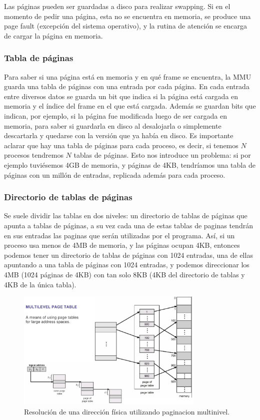 \documentclass{article}
\begin{document}
Las páginas pueden ser guardadas a disco para realizar swapping. Si en el momento de pedir una p\'agina, esta no se encuentra en memoria, se produce una page fault (excepci\'on del sistema operativo), y la rutina de atenci\'on se encarga de cargar la p\'agina en memoria. 

\subsubsection{Tabla de páginas}
Para saber si una p\'agina est\'a en memoria y en qu\'e frame se encuentra, la MMU guarda una tabla de p\'aginas con una entrada por cada p\'agina. En cada entrada entre diversos datos se guarda un bit que indica si la p\'agina est\'a cargada en memoria y el \'indice del frame en el que est\'a cargada. Adem\'as se guardan bits que indican, por ejemplo, si la p\'agina fue modificada luego de ser cargada en memoria, para saber si guardarla en disco al desalojarla o simplemente descartarla y quedarse con la versi\'on que ya hab\'ia en disco. Es importante aclarar que hay una tabla de p\'aginas para cada proceso, es decir, si tenemos $N$ procesos tendremos $N$ tablas de p\'aginas. Esto nos introduce un problema: si por ejemplo tuviésemos 4GB de memoria, y p\'aginas de 4KB, tendr\'iamos una tabla de p\'aginas con un mill\'on de entradas, replicada además para cada proceso. 

\subsubsection{Directorio de tablas de páginas}
Se suele dividir las tablas en dos niveles: un directorio de tablas de p\'aginas que apunta a tablas de p\'aginas, a su vez cada una de estas tablas de paginas tendrán en sus entradas las paginas que serán utilizadas por el programa. As\'i, si un proceso usa menos de 4MB de memoria, y las p\'aginas ocupan 4KB, entonces podemos tener un directorio de tablas de p\'aginas con 1024 entradas, una de ellas apuntando a una tabla de p\'aginas con 1024 entradas, y podemos direccionar los 4MB (1024 p\'aginas de 4KB) con tan solo 8KB (4KB del directorio de tablas y 4KB de la \'unica tabla).

\begin{figure}[H]
    \centering
    \includegraphics[width=0.8\textwidth]{imgs/memory_multi_level_paging.png}
    \caption{Resolución de una dirección física utilizando paginacion multinivel.}
    \label{fig:memory_multi_level_paging}
\end{figure}
\end{document}
